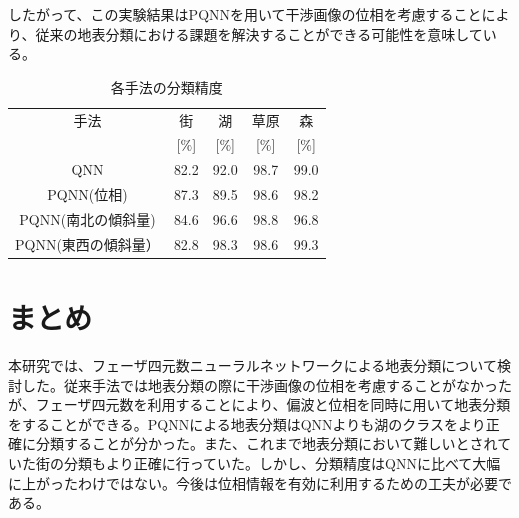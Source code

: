 \documentclass[a4j, twocolumn]{jsarticle}
\begin{document}
したがって、この実験結果はPQNNを用いて干渉画像の位相を考慮することにより、従来の地表分類における課題を解決することができる可能性を意味している。
\begin{table}[t]
  \begin{center}
    \caption{各手法の分類精度}
    \label{tab:accuracy}
    \begin{tabular}{c|c|c|c|c}
      \hline
      手法 & 街 & 湖 & 草原 & 森 \\ \cline{2-5}  & [$\%$] & [$\%$] & [$\%$] & [$\%$] \\ \hline\hline
      QNN & 82.2 & 92.0 & 98.7 & 99.0 \\ \hline
	PQNN(位相) & 87.3 & 89.5 & 98.6 & 98.2 \\ \hline
	PQNN(南北の傾斜量) & 84.6 & 96.6 & 98.8 & 96.8 \\ \hline
      PQNN(東西の傾斜量） & 82.8 & 98.3 & 98.6 & 99.3 \\ \hline
    \end{tabular}   
  \end{center}
\end{table}
\section{まとめ}
本研究では、フェーザ四元数ニューラルネットワークによる地表分類について検討した。従来手法では地表分類の際に干渉画像の位相を考慮することがなかったが、フェーザ四元数を利用することにより、偏波と位相を同時に用いて地表分類をすることができる。PQNNによる地表分類はQNNよりも湖のクラスをより正確に分類することが分かった。また、これまで地表分類において難しいとされていた街の分類もより正確に行っていた。しかし、分類精度はQNNに比べて大幅に上がったわけではない。今後は位相情報を有効に利用するための工夫が必要である。



\end{document}
